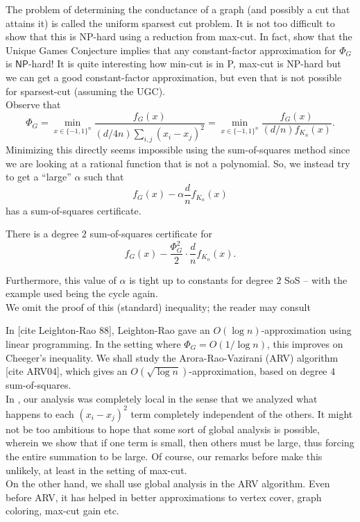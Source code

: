 	The problem of determining the conductance of a graph (and possibly a cut that attains it) is called the uniform sparsest cut problem. It is not too difficult to show that this is \textsf{NP}-hard using a reduction from max-cut. In fact, \cite{cond-appx-hard-ugc} show that the Unique Games Conjecture implies that any constant-factor approximation for $\Phi_G$ is $\mathsf{NP}$-hard! It is quite interesting how min-cut is in \textsf{P}, max-cut is \textsf{NP}-hard but we can get a good constant-factor approximation, but even that is not possible for sparsest-cut (assuming the UGC).\\

	Observe that
	\[ \Phi_G = \min_{x \in \{-1,1\}^n} \frac{f_G(x)}{(d/4n) \sum_{i,j} (x_i - x_j)^2} = \min_{x \in \{-1,1\}^n} \frac{f_G(x)}{(d/n) f_{K_n}(x)}. \]
	Minimizing this directly seems impossible using the sum-of-squares method since we are looking at a rational function that is not a polynomial. So, we instead try to get a ``large'' $\alpha$ such that
	\[ f_G(x) - \alpha \frac{d}{n} f_{K_n}(x) \]
	has a sum-of-squares certificate.
	
	\begin{ftheo}
		\label{cheegers inequality}
		There is a degree $2$ sum-of-squares certificate for
		\[ f_G(x) - \frac{\Phi_G^2}{2} \cdot \frac{d}{n} f_{K_n}(x). \]
	\end{ftheo}
	Furthermore, this value of $\alpha$ is tight up to constants for degree $2$ SoS -- with the example used being the cycle again.\\
	We omit the proof of this (standard) inequality; the reader may consult 

	In [cite Leighton-Rao 88], Leighton-Rao gave an $O(\log n)$-approximation using linear programming. In the setting where $\Phi_G = O(1/\log n)$, this improves on Cheeger's inequality. We shall study the Arora-Rao-Vazirani (ARV) algorithm [cite ARV04], which gives an $O(\sqrt{\log n})$-approximation, based on degree $4$ sum-of-squares. \\
	In , our analysis was completely local in the sense that we analyzed what happens to each $(x_i - x_j)^2$ term completely independent of the others. It might not be too ambitious to hope that some sort of global analysis is possible, wherein we show that if one term is small, then others must be large, thus forcing the entire summation to be large. Of course, our remarks before  make this unlikely, at least in the setting of max-cut.\\
	On the other hand, we shall use global analysis in the ARV algorithm. Even before ARV, it has helped in better approximations to vertex cover, graph coloring, max-cut gain etc.

